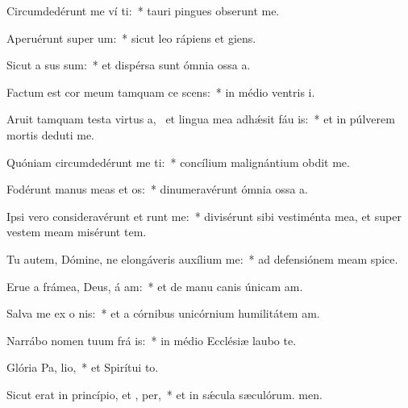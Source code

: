 \item Circumdedérunt me ví ti:~* tauri pingues obserunt me.
\item Aperuérunt super   um:~* sicut leo rápiens et giens.
\item Sicut a sus sum:~* et dispérsa sunt ómnia ossa a.
\item Factum est cor meum tamquam ce scens:~* in médio ventris i.
\item Aruit tamquam testa virtus a,~\pscross{} et lingua mea adhǽsit fáu is:~* et in púlverem mortis deduti me.
\item Quóniam circumdedérunt me  ti:~* concílium malignántium obdit me.
\item Fodérunt manus meas et  os:~* dinumeravérunt ómnia ossa a.
\item Ipsi vero consideravérunt et runt me:~* divisérunt sibi vestiménta mea, et super vestem meam misérunt tem.
\item Tu autem, Dómine, ne elongáveris auxílium   me:~* ad defensiónem meam spice.
\item Erue a frámea, Deus, á am:~* et de manu canis únicam am.
\item Salva me ex o nis:~* et a córnibus unicórnium humilitátem am.
\item Narrábo nomen tuum frá is:~* in médio Ecclésiæ laubo te.
\item Glória Pa,  lio,~* et Spirítui to.
\item Sicut erat in princípio, et ,  per,~* et in sǽcula sæculórum. men.
